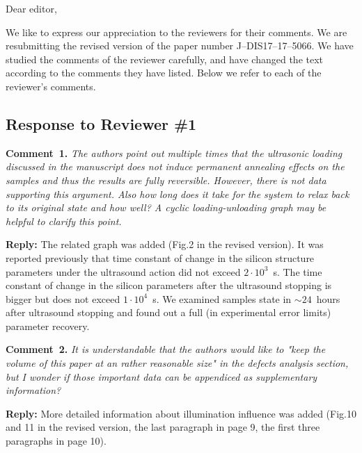\documentclass[aip,jap,preprint]{revtex4-1}
\begin{document}
Dear editor,

We like to express our appreciation to the reviewers for their comments.
We are resubmitting the revised version of the paper number J--DIS17--17--5066.
We have studied the comments of the reviewer carefully, and have changed the text according to the comments they
have listed.
Below we refer to each of the reviewer’s comments.



\subsection*{Response to Reviewer \#1 }

\noindent
\textcolor[rgb]{0.00,0.50,1.00}{\textbf{Comment~1.}}
\emph{The authors point out multiple times that the ultrasonic loading discussed in the manuscript does not induce permanent annealing effects on the samples and thus the results are fully reversible.
However, there is not data supporting this argument.
Also how long does it take for the system to relax back to its original state and how well?
A cyclic loading-unloading graph may be helpful to clarify this point.}

\noindent
\textcolor[rgb]{0.51,0.00,0.00}{\textbf{Reply:}}
The related graph was added (Fig.2 in the revised version).
It was reported previously\cite{Ostapenko1995,YOlikhTPL2011,Olikh:Ultras,Olikh2011Sem,Ostrovskii2001,OlikhPSS} that time constant of change in the silicon structure parameters under the ultrasound action  did not exceed $2\cdot10^3$~s.
The time constant of change in the silicon parameters after the ultrasound stopping is bigger but does not exceed $1\cdot10^4$~s\cite{OlikhPSS}.
We examined samples state in $\sim24$~hours after ultrasound stopping and found out a full (in experimental error limits) parameter recovery.



\vspace{1cm}
\noindent
\textcolor[rgb]{0.00,0.50,1.00}{\textbf{Comment~2.}}
\emph{It is understandable that the authors would like to "keep the volume of this paper at an rather reasonable size" in the defects analysis section, but I wonder if those important data can be appendiced as supplementary information?}

\noindent
\textcolor[rgb]{0.51,0.00,0.00}{\textbf{Reply:}}
More detailed information about illumination influence was added (Fig.10 and 11 in the revised version, the last paragraph in page 9, the first three paragraphs in page 10).
\end{document}
